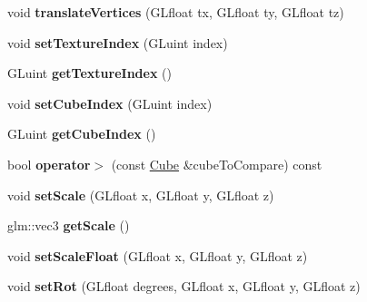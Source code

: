 \begin{DoxyCompactItemize}
\mbox{\label{classglimac_1_1Cube_a57a197e614422f798de48546c3a31b86}} 
void {\bfseries translate\+Vertices} (G\+Lfloat tx, G\+Lfloat ty, G\+Lfloat tz)
\item 
\mbox{\label{classglimac_1_1Cube_a6fad01deefdf4c607e114ef4d80f1a33}} 
void {\bfseries set\+Texture\+Index} (G\+Luint index)
\item 
\mbox{\label{classglimac_1_1Cube_afba78172419c5bf02bf04420e2fa8b09}} 
G\+Luint {\bfseries get\+Texture\+Index} ()
\item 
\mbox{\label{classglimac_1_1Cube_aa98b9f6d9554e658643eac25815b0b02}} 
void {\bfseries set\+Cube\+Index} (G\+Luint index)
\item 
\mbox{\label{classglimac_1_1Cube_a44474e1c5c5c77118922294f63f553f5}} 
G\+Luint {\bfseries get\+Cube\+Index} ()
\item 
\mbox{\label{classglimac_1_1Cube_a46cb8692b9572361e283e88913089bad}} 
bool {\bfseries operator$>$} (const \hyperlink{classglimac_1_1Cube}{Cube} \&cube\+To\+Compare) const
\item 
\mbox{\label{classglimac_1_1Cube_ac79f2d273f24a4ff19c78e6e3e55221a}} 
void {\bfseries set\+Scale} (G\+Lfloat x, G\+Lfloat y, G\+Lfloat z)
\item 
\mbox{\label{classglimac_1_1Cube_a354f33cc28a98c481620f7f349fef1f1}} 
glm\+::vec3 {\bfseries get\+Scale} ()
\item 
\mbox{\label{classglimac_1_1Cube_a846bf811b0634b6e353cb24b73d7bd71}} 
void {\bfseries set\+Scale\+Float} (G\+Lfloat x, G\+Lfloat y, G\+Lfloat z)
\item 
\mbox{\label{classglimac_1_1Cube_af89fa188e904dd7db6ebccff5f4c3f4f}} 
void {\bfseries set\+Rot} (G\+Lfloat degrees, G\+Lfloat x, G\+Lfloat y, G\+Lfloat z)
\item 
\mbox{\label{classglimac_1_1Cube_a1f4f0a3b4e1b4b320c4f7f3476e42985}} 

\end{DoxyCompactItemize}
